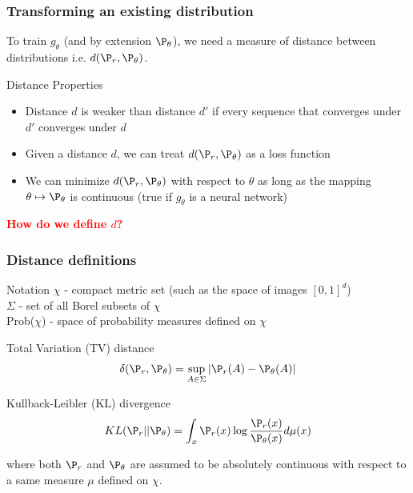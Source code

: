 \documentclass{beamer}
\begin{document}
\begin{frame}
\frametitle{Transforming an existing distribution}

To train $g_{\theta}$ (and by extension $\P_{\theta}$), we need a measure of distance between distributions i.e. $d(\P_{r},\P_{\theta})$.
\pause
\begin{block}{Distance Properties}
\begin{itemize}
\pause
\item{Distance $d$ is weaker than distance $d'$ if every sequence that converges under $d'$ converges under $d$}
\pause
\item{Given a distance $d$, we can treat $d(\P_{r},\P_{\theta})$ as a loss function}
\pause
\item{We can minimize $d(\P_{r},\P_{\theta})$ with respect to $\theta$ as long as the mapping $\theta \mapsto \P_{\theta}$ is continuous (true if $g_{\theta}$ is a neural network)}

\end{itemize}
\end{block}
\pause
\begin{center}
\textcolor{red}{\textbf{How do we define $d$?}}
\end{center}

\end{frame}

\begin{frame}
\frametitle{Distance definitions}

\pause
\begin{block}{Notation}
$\chi$ - compact metric set (such as the space of images $[0,1]^d$)\\
$\Sigma$ - set of all Borel subsets of $\chi$ \\
Prob($\chi$) - space of probability measures defined on $\chi$\\
\end{block}

\pause
\begin{block}{Total Variation (TV) distance}
\vspace{-5pt}
$$ \delta(\P_{r}, \P_{\theta}) = \sup_{A \in \Sigma} |\P_{r}(A) - \P_{\theta} (A)| $$
\vspace{-5pt}
\end{block}
\pause
\begin{block}{Kullback-Leibler (KL) divergence}
\vspace{-5pt}
$$ KL(\P_{r}||\P_{\theta}) = \int_{x} \P_{r}(x) \log\frac{\P_{r}(x)}{\P_{\theta}(x)} d\mu(x) $$

where both $\P_{r}$ and $\P_{\theta}$ are assumed to be absolutely continuous with respect to a same measure $\mu$ defined on $\chi$. 

\end{block}

\end{frame}
\end{document}
